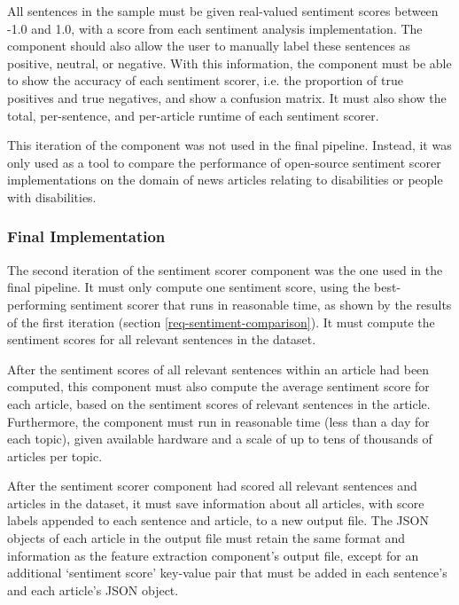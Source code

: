 \documentclass{report}
\begin{document}
All sentences in the sample must be given real-valued sentiment scores between -1.0 and 1.0, with a score from each sentiment analysis implementation.
The component should also allow the user to manually label these sentences as positive, neutral, or negative.
With this information, the component must be able to show the accuracy of each sentiment scorer, i.e. the proportion of true positives and true negatives, and show a confusion matrix.
It must also show the total, per-sentence, and per-article runtime of each sentiment scorer.

This iteration of the component was not used in the final pipeline.
Instead, it was only used as a tool to compare the performance of open-source sentiment scorer implementations on the domain of news articles relating to disabilities or people with disabilities.

\subsubsection{Final Implementation} \label{req-sentiment-final}

The second iteration of the sentiment scorer component was the one used in the final pipeline.
It must only compute one sentiment score, using the best-performing sentiment scorer that runs in reasonable time, as shown by the results of the first iteration (section \ref{req-sentiment-comparison}).
It must compute the sentiment scores for all relevant sentences in the dataset.

After the sentiment scores of all relevant sentences within an article had been computed, this component must also compute the average sentiment score for each article, based on the sentiment scores of relevant sentences in the article.
Furthermore, the component must run in reasonable time (less than a day for each topic), given available hardware and a scale of up to tens of thousands of articles per topic.

After the sentiment scorer component had scored all relevant sentences and articles in the dataset, it must save information about all articles, with score labels appended to each sentence and article, to a new output file.
The JSON objects of each article in the output file must retain the same format and information as the feature extraction component's output file, except for an additional `sentiment score' key-value pair that must be added in each sentence's and each article's JSON object.
\end{document}
